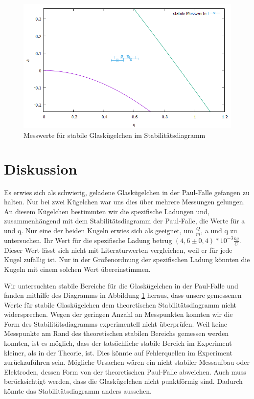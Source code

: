 \documentclass[10pt,a4paper]{article}
\begin{document}
\begin{figure}[h]
	\includegraphics[scale = 0.7]{stabiler_bereich.png}
	\centering
	\caption{Messwerte für stabile Glaskügelchen im Stabilitätsdiagramm}
	\label{stabiler_bereich1}
\end{figure}

\section{Diskussion}

Es erwies sich als schwierig, geladene Glaskügelchen in der Paul-Falle gefangen zu halten. Nur bei zwei Kügelchen war uns dies über mehrere Messungen gelungen. An diesem Kügelchen bestimmten wir die spezifische Ladungen und, zusammenhängend mit dem Stabilitätsdiagramm der Paul-Falle, die Werte für a und q.
Nur eine der beiden Kugeln erwies sich als geeignet, um $\frac{Q}{m}$, a und q zu untersuchen. Ihr Wert für die spezifische Ladung betrug $(4,6 \pm 0,4)*10^{-3} \frac{kg}{C}$. Dieser Wert lässt sich nicht mit Literaturwerten vergleichen, weil er für jede Kugel zufällig ist. Nur in der Größenordnung der spezifischen Ladung könnten die Kugeln mit einem solchen Wert übereinstimmen.

Wir untersuchten stabile Bereiche für die Glaskügelchen in der Paul-Falle und fanden mithilfe des Diagramms in Abbildung \ref{stabiler_bereich1} heraus, dass unsere gemessenen Werte für stabile Glaskügelchen dem theoretischen Stabilitätsdiagramm nicht widersprechen. Wegen der geringen Anzahl an Messpunkten konnten wir die Form des Stabilitätsdiagramms experimentell nicht überprüfen. Weil keine Messpunkte am Rand des theoretischen stabilen Bereichs gemessen werden konnten, ist es möglich, dass der tatsächliche stabile Bereich im Experiment kleiner, als in der Theorie, ist. Dies könnte auf Fehlerquellen im Experiment zurückzuführen sein. Mögliche Ursachen wären ein nicht stabiler Messaufbau oder Elektroden, dessen Form von der theoretischen Paul-Falle abweichen. Auch muss berücksichtigt werden, dass die Glaskügelchen nicht punktförmig sind. Dadurch könnte das Stabilitätsdiagramm anders aussehen.
\end{document}
